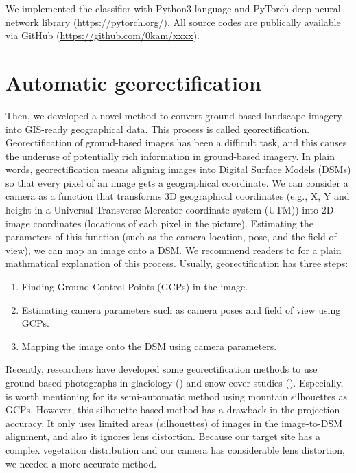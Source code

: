 \documentclass{article}
\providecommand{\tightlist}{%
  \setlength{\itemsep}{0pt}\setlength{\parskip}{0pt}}
\begin{document}
We implemented the classifier with Python3 language and PyTorch deep neural network library (\url{https://pytorch.org/}). All source codes are publically available via GitHub (\url{https://github.com/0kam/xxxx}).

\hypertarget{automatic-georectification}{%
\section{Automatic georectification}\label{automatic-georectification}}

Then, we developed a novel method to convert ground-based landscape imagery into GIS-ready geographical data. This process is called georectification. Georectification of ground-based images has been a difficult task, and this causes the underuse of potentially rich information in ground-based imagery. In plain words, georectification means aligning images into Digital Surface Models (DSMs) so that every pixel of an image gets a geographical coordinate. We can consider a camera as a function that transforms 3D geographical coordinates (e.g., X, Y and height in a Universal Transverse Mercator coordinate system (UTM)) into 2D image coordinates (locations of each pixel in the picture). Estimating the parameters of this function (such as the camera location, pose, and the field of view), we can map an image onto a DSM. We recommend readers to \cite{Portenier2020Cryosphere} for a plain mathmatical explanation of this process. Usually, georectification has three steps:

\begin{enumerate}
\def\labelenumi{\arabic{enumi}.}
\tightlist
\item
  Finding Ground Control Points (GCPs) in the image.\\
\item
  Estimating camera parameters such as camera poses and field of view using GCPs.\\
\item
  Mapping the image onto the DSM using camera parameters.
\end{enumerate}

Recently, researchers have developed some georectification methods to use ground-based photographs in glaciology (\cite{Messerli2015GeoInst}) and snow cover studies (\cite{Portenier2020Cryosphere}). Especially, \cite{Portenier2020Cryosphere} is worth mentioning for its semi-automatic method using mountain silhouettes as GCPs. However, this silhouette-based method has a drawback in the projection accuracy. It only uses limited areas (silhouettes) of images in the image-to-DSM alignment, and also it ignores lens distortion. Because our target site has a complex vegetation distribution and our camera has considerable lens distortion, we needed a more accurate method.
\end{document}
